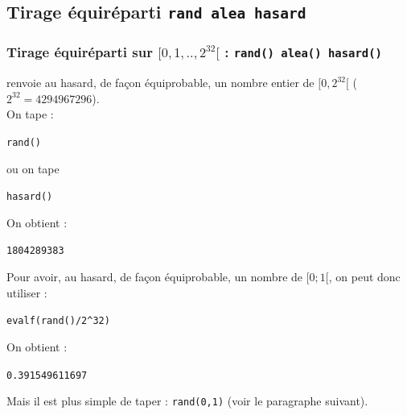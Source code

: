\documentclass[a4paper,11pt]{book}
\begin{document}
\subsection{Tirage \'equir\'eparti {\tt rand alea hasard}}
\subsubsection{Tirage \'equir\'eparti sur $[0,1,..,2^{32}[$ : {\tt rand() alea() hasard()}}
 renvoie au hasard, de fa\c{c}on \'equiprobable, un nombre 
entier de $[0,2^{32}[$ ($2^{32}=4294967296$).\\
On tape :
\begin{center}{\tt rand()}\end{center}
ou on tape
\begin{center}{\tt hasard()}\end{center}
On obtient :
\begin{center}{\tt 1804289383}\end{center}
Pour avoir, au hasard, de fa\c{c}on \'equiprobable, un nombre de $[0;1[$, on 
  peut donc utiliser :
\begin{center}{\tt evalf(rand()/2\verb|^|32)}\end{center}
On obtient :
\begin{center}{\tt  0.391549611697}\end{center}
Mais il est plus simple de taper : {\tt rand(0,1)} (voir le paragraphe 
suivant).
\end{document}
